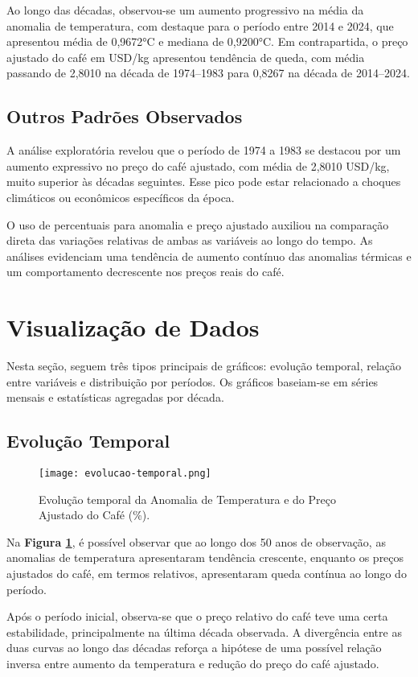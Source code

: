\documentclass[12pt]{article}
\begin{document}
Ao longo das décadas, observou-se um aumento progressivo na média da anomalia de temperatura, com destaque para o período entre 2014 e 2024, que apresentou média de 0,9672°C e mediana de 0,9200°C. Em contrapartida, o preço ajustado do café em USD/kg apresentou tendência de queda, com média passando de 2,8010 na década de 1974–1983 para 0,8267 na década de 2014–2024.

\subsection{Outros Padrões Observados}
A análise exploratória revelou que o período de 1974 a 1983 se destacou por um aumento expressivo no preço do café ajustado, com média de 2,8010 USD/kg, muito superior às décadas seguintes. Esse pico pode estar relacionado a choques climáticos ou econômicos específicos da época.

O uso de percentuais para anomalia e preço ajustado auxiliou na comparação direta das variações relativas de ambas as variáveis ao longo do tempo. As análises evidenciam uma tendência de aumento contínuo das anomalias térmicas e um comportamento decrescente nos preços reais do café.

\section{Visualização de Dados}
Nesta seção, seguem três tipos principais de gráficos: evolução temporal, relação entre variáveis e distribuição por períodos. Os gráficos baseiam-se em séries mensais e estatísticas agregadas por década.

\subsection{Evolução Temporal}

\begin{figure}[ht]
\centering
\texttt{[image: evolucao-temporal.png]}
\caption{Evolução temporal da Anomalia de Temperatura e do Preço Ajustado do Café (\%).}
\label{fig:evolucao}
\end{figure}

Na \textbf{Figura \ref{fig:evolucao}}, é possível observar que ao longo dos 50 anos de observação, as anomalias de temperatura apresentaram tendência crescente, enquanto os preços ajustados do café, em termos relativos, apresentaram queda contínua ao longo do período.

Após o período inicial, observa-se que o preço relativo do café teve uma certa estabilidade, principalmente na última década observada. A divergência entre as duas curvas ao longo das décadas reforça a hipótese de uma possível relação inversa entre aumento da temperatura e redução do preço do café ajustado.
\end{document}
